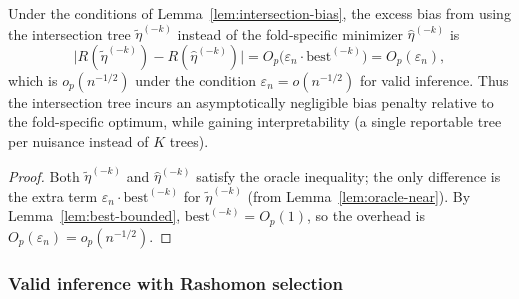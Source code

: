 \documentclass[12pt]{article}
\begin{document}
\begin{corollary}
\label{cor:intersection-overhead}
Under the conditions of Lemma~\ref{lem:intersection-bias}, the excess bias from using the intersection tree $\tilde{\eta}^{(-k)}$ instead of the fold-specific minimizer $\hat\eta^{(-k)}$ is
\[
\bigl| R(\tilde{\eta}^{(-k)}) - R(\hat\eta^{(-k)}) \bigr| = O_p\bigl( \varepsilon_n \cdot \text{best}^{(-k)} \bigr) = O_p(\varepsilon_n),
\]
which is $o_p(n^{-1/2})$ under the condition $\varepsilon_n = o(n^{-1/2})$ for valid inference. Thus the intersection tree incurs an asymptotically negligible bias penalty relative to the fold-specific optimum, while gaining interpretability (a single reportable tree per nuisance instead of $K$ trees).
\end{corollary}

\begin{proof}
Both $\tilde{\eta}^{(-k)}$ and $\hat\eta^{(-k)}$ satisfy the oracle inequality; the only difference is the extra term $\varepsilon_n \cdot \text{best}^{(-k)}$ for $\tilde{\eta}^{(-k)}$ (from Lemma~\ref{lem:oracle-near}). By Lemma~\ref{lem:best-bounded}, $\text{best}^{(-k)} = O_p(1)$, so the overhead is $O_p(\varepsilon_n) = o_p(n^{-1/2})$.
\end{proof}

\subsubsection{Valid inference with Rashomon selection}
\end{document}
